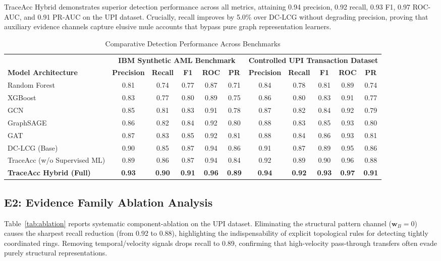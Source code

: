 \documentclass[journal]{IEEEtran}
\begin{document}
TraceAcc Hybrid demonstrates superior detection performance across all metrics, attaining 0.94 precision, 0.92 recall, 0.93 F1, 0.97 ROC-AUC, and 0.91 PR-AUC on the UPI dataset. Crucially, recall improves by 5.0\% over DC-LCG without degrading precision, proving that auxiliary evidence channels capture elusive mule accounts that bypass pure graph representation learners.

\begin{table}[t]
\centering
\caption{Comparative Detection Performance Across Benchmarks}
\label{tab:baseline_results}
\begin{tabular}{lcccccccccc}
\toprule
& \multicolumn{5}{c}{\textbf{IBM Synthetic AML Benchmark}} & \multicolumn{5}{c}{\textbf{Controlled UPI Transaction Dataset}} \\
\cmidrule(lr){2-6} \cmidrule(lr){7-11}
\textbf{Model Architecture} & \textbf{Precision} & \textbf{Recall} & \textbf{F1} & \textbf{ROC} & \textbf{PR} & \textbf{Precision} & \textbf{Recall} & \textbf{F1} & \textbf{ROC} & \textbf{PR} \\
\midrule
Random Forest \cite{breiman2001random} & 0.81 & 0.74 & 0.77 & 0.87 & 0.71 & 0.84 & 0.78 & 0.81 & 0.89 & 0.74 \\
XGBoost \cite{chen2016xgboost} & 0.83 & 0.77 & 0.80 & 0.89 & 0.75 & 0.86 & 0.80 & 0.83 & 0.91 & 0.77 \\
GCN \cite{kipf2017semi} & 0.85 & 0.81 & 0.83 & 0.91 & 0.78 & 0.87 & 0.82 & 0.84 & 0.92 & 0.79 \\
GraphSAGE \cite{hamilton2017inductive} & 0.86 & 0.82 & 0.84 & 0.92 & 0.80 & 0.88 & 0.83 & 0.85 & 0.93 & 0.80 \\
GAT \cite{velickovic2018graph} & 0.87 & 0.83 & 0.85 & 0.92 & 0.81 & 0.88 & 0.84 & 0.86 & 0.93 & 0.81 \\
DC-LCG (Base) \cite{li2026dclcg} & 0.90 & 0.85 & 0.87 & 0.94 & 0.86 & 0.91 & 0.87 & 0.89 & 0.95 & 0.86 \\
TraceAcc (w/o Supervised ML) & 0.89 & 0.86 & 0.87 & 0.94 & 0.84 & 0.92 & 0.89 & 0.90 & 0.96 & 0.88 \\
\textbf{TraceAcc Hybrid (Full)} & \textbf{0.93} & \textbf{0.90} & \textbf{0.91} & \textbf{0.96} & \textbf{0.89} & \textbf{0.94} & \textbf{0.92} & \textbf{0.93} & \textbf{0.97} & \textbf{0.91} \\
\bottomrule
\end{tabular}
\end{table}

\subsection{E2: Evidence Family Ablation Analysis}
Table~\ref{tab:ablation} reports systematic component-ablation on the UPI dataset. Eliminating the structural pattern channel ($\mathbf{w}_B = 0$) causes the sharpest recall reduction (from 0.92 to 0.88), highlighting the indispensability of explicit topological rules for detecting tightly coordinated rings. Removing temporal/velocity signals drops recall to 0.89, confirming that high-velocity pass-through transfers often evade purely structural representations.
\end{document}
